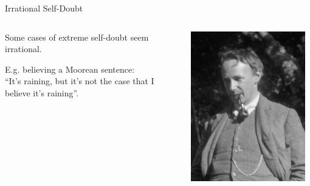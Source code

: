 \documentclass[aspectratio=169, dvipsnames]{beamer}
\begin{document}
\begin{frame}{Irrational Self-Doubt}
  \begin{columns}
    \begin{column}{.69\linewidth}
      Some cases of extreme self-doubt seem irrational.
      \vspace{20pt}
      
      E.g. believing a \alert{Moorean sentence}:\\
      ``It's raining, but it's not the case that I believe it's raining''.\\
    \end{column}
    \begin{column}{.3\linewidth}
      \begin{center}
      \includegraphics[width=0.95\textwidth]{GEMoore.jpg}
      \end{center}
    \end{column}
  \end{columns}
\end{frame}
\end{document}
